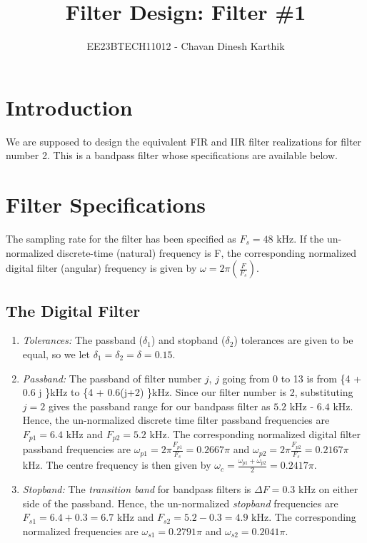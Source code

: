 \documentclass{article}
\begin{document}
\title{ Filter Design: Filter \#1}

\author{EE23BTECH11012 - Chavan Dinesh Karthik}

\maketitle
\section{Introduction}
We are supposed to design the equivalent FIR and IIR filter realizations for filter number 2.  
This is a bandpass filter whose specifications are available below.

\section{Filter Specifications}
The sampling rate for the filter has been specified as $F_s =  48$ kHz.	If the un-normalized  discrete-time (natural) frequency is F, the corresponding normalized digital filter (angular) frequency is given by $\omega = 2\pi
\left(\frac{F}{F_s}\right)$.

\subsection{The Digital Filter}

\begin{enumerate}
\item {\em Tolerances:}  The passband ($\delta_1$) and stopband ($\delta_2$) tolerances are given to
be equal, so we let $\delta_1 = \delta_2 = \delta = 0.15$.

\item {\em Passband:}  The passband of filter number $j$, $j$ going from 0 to 13 is from \{4 + 0.6 j \}kHz
to \{4 + 0.6(j+2) \}kHz.  Since our filter number is 2, substituting $j = 2$ gives the passband
range for our bandpass filter as $5.2$ kHz - $6.4$ kHz.  Hence, the un-normalized discrete time filter
passband frequencies are $F_{p1} = 6.4$ kHz
and $F_{p2} = 5.2$ kHz.  The corresponding normalized digital filter passband frequencies are
$\omega_{p1} = 2\pi\frac{F_{p1}}{F_s}  = 0.2667\pi$  and $\omega_{p2} = 2\pi\frac{F_{p2}}{F_s}  = 0.2167 \pi$ kHz.  The centre frequency is then given by  $\omega_c = \frac{\omega_{p1} + \omega_{p2}}{2} = 0.2417\pi$.  

\item {\em Stopband:}  The {\em transition band} for bandpass filters is $\Delta F = 0.3$ kHz on either side of the passband.
Hence, the un-normalized {\em stopband} frequencies are $F_{s1} = 6.4 + 0.3 = 6.7$ kHz and $F	_{s2} = 5.2 - 0.3 = 4.9$ kHz.  The corresponding normalized frequencies are $\omega_{s1} = 0.2791 \pi$  and $\omega_{s2} =  0.2041 \pi$.
\end{enumerate}
\end{document}

